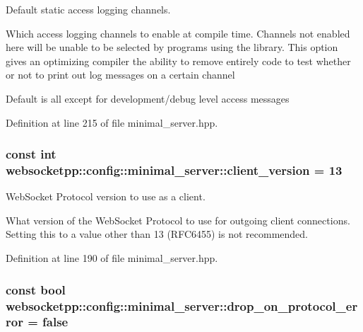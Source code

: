 Default static access logging channels. 

Which access logging channels to enable at compile time. Channels not enabled here will be unable to be selected by programs using the library. This option gives an optimizing compiler the ability to remove entirely code to test whether or not to print out log messages on a certain channel

Default is all except for development/debug level access messages 

Definition at line 215 of file minimal\+\_\+server.\+hpp.

\subsubsection[{\texorpdfstring{client\+\_\+version}{client\_version}}]{\setlength{\rightskip}{0pt plus 5cm}const int websocketpp\+::config\+::minimal\+\_\+server\+::client\+\_\+version = 13\hspace{0.3cm}{\ttfamily [static]}}\hypertarget{structwebsocketpp_1_1config_1_1minimal__server_a186c68735f459a3242d68821c82551bc}{}\label{structwebsocketpp_1_1config_1_1minimal__server_a186c68735f459a3242d68821c82551bc}


Web\+Socket Protocol version to use as a client. 

What version of the Web\+Socket Protocol to use for outgoing client connections. Setting this to a value other than 13 (R\+F\+C6455) is not recommended. 

Definition at line 190 of file minimal\+\_\+server.\+hpp.

\subsubsection[{\texorpdfstring{drop\+\_\+on\+\_\+protocol\+\_\+error}{drop\_on\_protocol\_error}}]{\setlength{\rightskip}{0pt plus 5cm}const bool websocketpp\+::config\+::minimal\+\_\+server\+::drop\+\_\+on\+\_\+protocol\+\_\+error = false\hspace{0.3cm}{\ttfamily [static]}}\hypertarget{structwebsocketpp_1_1config_1_1minimal__server_aab09bf45ad78310426a04636ad64c2bd}{}\label{structwebsocketpp_1_1config_1_1minimal__server_aab09bf45ad78310426a04636ad64c2bd}


